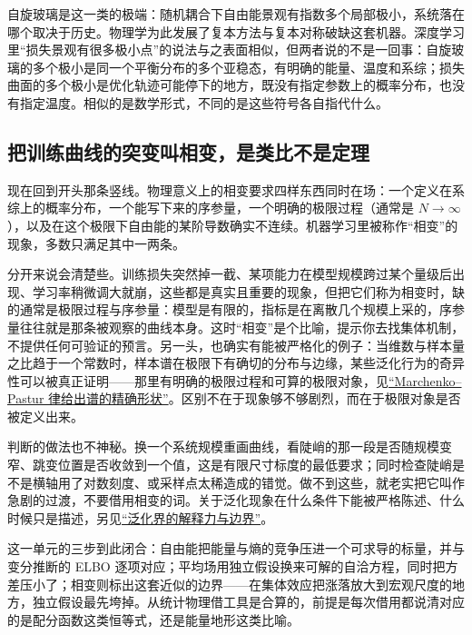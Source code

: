 自旋玻璃是这一类的极端：随机耦合下自由能景观有指数多个局部极小，系统落在哪个取决于历史。物理学为此发展了复本方法与复本对称破缺这套机器。深度学习里``损失景观有很多极小点''的说法与之表面相似，但两者说的不是一回事：自旋玻璃的多个极小是同一个平衡分布的多个亚稳态，有明确的能量、温度和系综；损失曲面的多个极小是优化轨迹可能停下的地方，既没有指定参数上的概率分布，也没有指定温度。相似的是数学形式，不同的是这些符号各自指代什么。

\subsection{把训练曲线的突变叫相变，是类比不是定理}

现在回到开头那条竖线。物理意义上的相变要求四样东西同时在场：一个定义在系综上的概率分布，一个能写下来的序参量，一个明确的极限过程（通常是 \(N\to\infty\)），以及在这个极限下自由能的某阶导数确实不连续。机器学习里被称作``相变''的现象，多数只满足其中一两条。

分开来说会清楚些。训练损失突然掉一截、某项能力在模型规模跨过某个量级后出现、学习率稍微调大就崩，这些都是真实且重要的现象，但把它们称为相变时，缺的通常是极限过程与序参量：模型是有限的，指标是在离散几个规模上采的，序参量往往就是那条被观察的曲线本身。这时``相变''是个比喻，提示你去找集体机制，不提供任何可验证的预言。另一头，也确实有能被严格化的例子：当维数与样本量之比趋于一个常数时，样本谱在极限下有确切的分布与边缘，某些泛化行为的奇异性可以被真正证明——那里有明确的极限过程和可算的极限对象，见\hyperref[sec:11-Mathematical-Statistics/09-Random-Matrix-Theory/02]{``Marchenko--Pastur 律给出谱的精确形状''}。区别不在于现象够不够剧烈，而在于极限对象是否被定义出来。

判断的做法也不神秘。换一个系统规模重画曲线，看陡峭的那一段是否随规模变窄、跳变位置是否收敛到一个值，这是有限尺寸标度的最低要求；同时检查陡峭是不是横轴用了对数刻度、或采样点太稀造成的错觉。做不到这些，就老实把它叫作急剧的过渡，不要借用相变的词。关于泛化现象在什么条件下能被严格陈述、什么时候只是描述，另见\hyperref[sec:13-Machine-Learning/10-Learning-Theory/04]{``泛化界的解释力与边界''}。

这一单元的三步到此闭合：自由能把能量与熵的竞争压进一个可求导的标量，并与变分推断的 ELBO 逐项对应；平均场用独立假设换来可解的自洽方程，同时把方差压小了；相变则标出这套近似的边界——在集体效应把涨落放大到宏观尺度的地方，独立假设最先垮掉。从统计物理借工具是合算的，前提是每次借用都说清对应的是配分函数这类恒等式，还是能量地形这类比喻。
